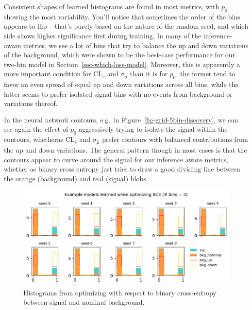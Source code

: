 \documentclass[
  11pt,
  numbers=noendperiod]{book}
\begin{document}
Consistent shapes of learned histograms are found in most metrics, with
\(p_0\) showing the most variability. You'll notice that sometimes the
order of the bins appears to flip -- that's purely based on the nature
of the random seed, and which side shows higher significance first
during training. In many of the inference-aware metrics, we see a lot of
bins that try to balance the up and down variations of the background,
which were shown to be the best-case performance for our two-bin model
in Section~\ref{sec-which-loss-model}. Moreover, this is apparently a
more important condition for \(\mathrm{CL}_s\) and
\(\sigma_{\hat{\mu}}\) than it is for \(p_0\); the former tend to favor
an even spread of equal up and down variations across all bins, while
the latter seems to prefer isolated signal bins with no events from
background or variations thereof.

In the neural network contours, e.g.~in
Figure~\ref{fig-grid-5bin-discovery}, we can see again the effect of
\(p_0\) aggressively trying to isolate the signal within the contours,
whetheras \(\mathrm{CL}_s\) and \(\sigma_{\hat{\mu}}\) prefer contours
with balanced contributions from the up and down variations. The general
pattern though in most cases is that the contours appear to curve around
the signal for our inference aware metrics, whether as binary cross
entropy just tries to draw a good dividing line between the orange
(background) and teal (signal) blobs.

\begin{figure}

{\centering \includegraphics{./images/new-hist-models-bce-5nobin.pdf}

}

\caption{\label{fig-hists-5bin-bce}Histograms from optimizing with
respect to binary cross-entropy between signal and nominal background.}

\end{figure}
\end{document}
